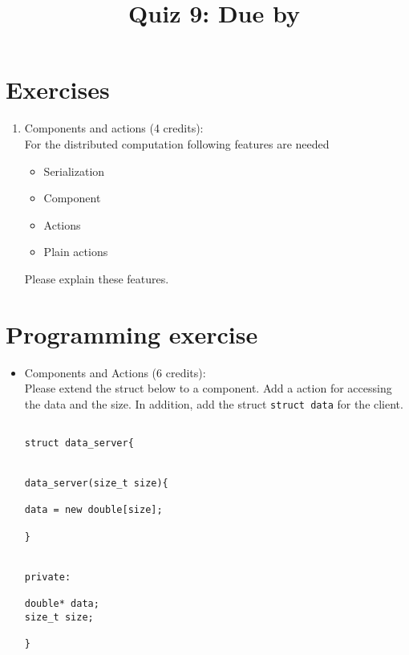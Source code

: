 \documentclass[11pt]{article}
\begin{document}
\title{\coursename~Quiz 9: Due by }
\date{}
\maketitle

\medskip


\section*{Exercises}

\begin{enumerate}
\item Components and actions (4 credits): \\
For the distributed computation following features are needed
\begin{itemize}
\item Serialization
\item Component
\item Actions 
\item Plain actions
\end{itemize}
Please explain these features.

\end{enumerate}


\section*{Programming exercise}

\begin{itemize}
\item Components and Actions (6 credits): \\
Please extend the struct below to a component. Add a action for accessing the data and the size. In addition, add the struct \lstinline|struct data| for the client.
\begin{lstlisting}

struct data_server{


data_server(size_t size){

data = new double[size];

}


private:

double* data;
size_t size;

}
\end{lstlisting}

\end{itemize}


\doclicenseThis 
\end{document}
